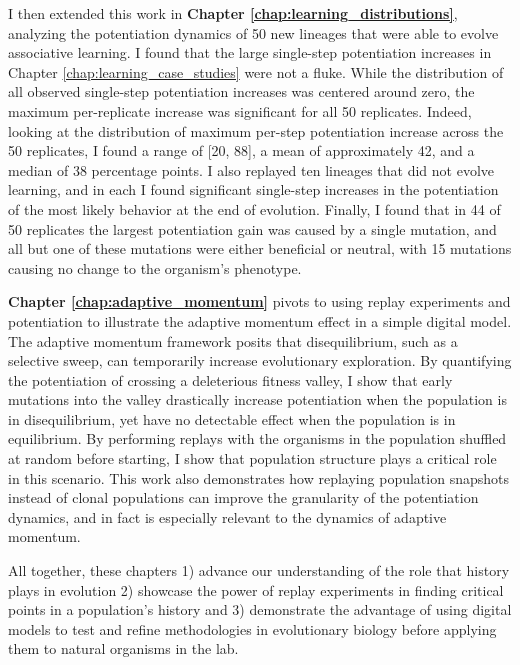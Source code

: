 I then extended this work in \textbf{Chapter \ref{chap:learning_distributions}}, analyzing the potentiation dynamics of 50 new lineages that were able to evolve associative learning.  
I found that the large single-step potentiation increases in Chapter \ref{chap:learning_case_studies} were not a fluke. 
While the distribution of all observed single-step potentiation increases was centered around zero, the maximum per-replicate increase was significant for all 50 replicates. 
Indeed, looking at the distribution of maximum per-step potentiation increase across the 50 replicates, I found a range of [20, 88], a mean of approximately 42, and a median of 38 percentage points. 
I also replayed ten lineages that did not evolve learning, and in each I found significant single-step increases in the potentiation of the most likely behavior at the end of evolution. 
Finally, I found that in 44 of 50 replicates the largest potentiation gain was caused by a single mutation, and all but one of these mutations were either beneficial or neutral, with 15 mutations causing no change to the organism's phenotype. 

\textbf{Chapter \ref{chap:adaptive_momentum}} pivots to using replay experiments and potentiation to illustrate the adaptive momentum effect in a simple digital model. 
The adaptive momentum framework posits that disequilibrium, such as a selective sweep, can temporarily increase evolutionary exploration. 
By quantifying the potentiation of crossing a deleterious fitness valley, I show that early mutations into the valley drastically increase potentiation when the population is in disequilibrium, yet have no detectable effect when the population is in equilibrium. 
By performing replays with the organisms in the population shuffled at random before starting, I show that population structure plays a critical role in this scenario. 
This work also demonstrates how replaying population snapshots instead of clonal populations can improve the granularity of the potentiation dynamics, and in fact is especially relevant to the dynamics of adaptive momentum. 

All together, these chapters 
1) advance our understanding of the role that history plays in evolution
2) showcase the power of replay experiments in finding critical points in a population's history and 
3) demonstrate the advantage of using digital models to test and refine methodologies in evolutionary biology before applying them to natural organisms in the lab. 